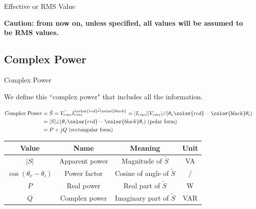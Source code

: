 \documentclass{beamer}
\begin{document}
\begin{frame}{Effective or RMS Value}

\textbf{Caution: from now on, unless specified, all values will be assumed to be RMS values.}
\end{frame}


\subsection{Complex Power}
\begin{frame}{Complex Power}

We define this ``complex power" that includes all the information.

$$\begin{aligned}
    \text{Complex Power}&=\tilde{S}=\tilde{V_{rms}}\tilde{I_{rms}^{\color{red}*\color{black}}} = \lvert I_{rms}\rvert \lvert V_{rms} \rvert \angle (\theta_{v}\color{red}-\color{black}\theta_{i})\\
    &=\lvert S \rvert \angle (\theta_{v}\color{red}-\color{black}\theta_{i}) \text{ (polar form)}\\
    &= P+jQ \text{ (rectangular form)}
\end{aligned}$$

\begin{table}[]
    \centering
    \begin{tabular}{cccc}
        \toprule
        Value & Name & Meaning & Unit \\
        \midrule
        $\vert S\vert$ & Apparent power & Magnitude of $\tilde{S}$ & VA \\
        $\cos(\theta_v-\theta_i)$ & Power factor & Cosine of angle of $\tilde{S}$  & / \\ 
        $P$ & Real power & Real part of $\tilde{S}$ & W \\
        $Q$ & Complex power & Imaginary part of $\tilde{S}$ & VAR  \\
        \bottomrule
    \end{tabular}
\end{table}


\end{frame}
\end{document}
